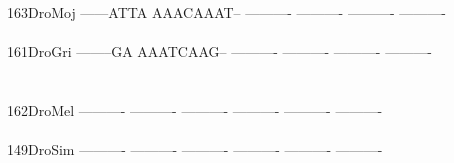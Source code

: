 \documentclass[11pt,twoside,reqno,a4paper]{article}
\begin{document}
{163\hspace*{2\charwidth}DroMoj	------ATTA	AAACAAAT--	----------	----------	----------	----------	\\
\hspace*{5\charwidth}\hspace*{7\charwidth}\hspace*{1\charwidth}\hspace*{1\charwidth}\hspace*{1\charwidth}\hspace*{1\charwidth}\hspace*{1\charwidth}\hspace*{1\charwidth}\\
161\hspace*{2\charwidth}DroGri	--------GA	AAATCAAG--	----------	----------	----------	----------	\\
\hspace*{5\charwidth}\hspace*{7\charwidth}\hspace*{1\charwidth}\hspace*{1\charwidth}\hspace*{1\charwidth}\hspace*{1\charwidth}\hspace*{1\charwidth}\hspace*{1\charwidth}\\
\\
162\hspace*{2\charwidth}DroMel	----------	----------	----------	----------	----------	----------	\\
\hspace*{5\charwidth}\hspace*{7\charwidth}\hspace*{1\charwidth}\hspace*{1\charwidth}\hspace*{1\charwidth}\hspace*{1\charwidth}\hspace*{1\charwidth}\hspace*{1\charwidth}\\
149\hspace*{2\charwidth}DroSim	----------	----------	----------	----------	----------	----------	\\
\hspace*{5\charwidth}\hspace*{7\charwidth}\hspace*{1\charwidth}\hspace*{1\charwidth}\hspace*{1\charwidth}\hspace*{1\charwidth}\hspace*{1\charwidth}\hspace*{1\charwidth}\\
}
\end{document}
